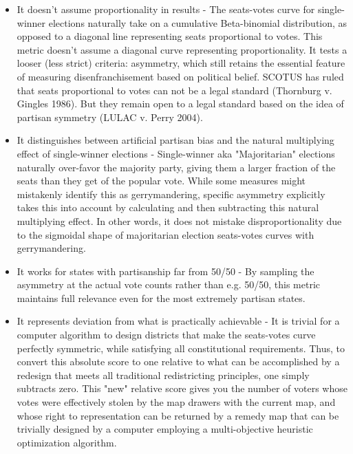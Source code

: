 \documentclass[preprint,12pt]{article}
\begin{document}
\begin{itemize}

\item It doesn't assume proportionality in results - The seats-votes curve for single-winner elections naturally take on a cumulative Beta-binomial distribution, as opposed to a diagonal line representing seats proportional to votes.  This metric doesn't assume a diagonal curve representing proportionality.  It tests a looser (less strict) criteria: asymmetry, which still retains the essential feature of measuring disenfranchisement based on political belief.  SCOTUS has ruled that seats proportional to votes can not be a legal standard (Thornburg v. Gingles 1986).   But they remain open to a legal standard based on the idea of partisan symmetry (LULAC v. Perry 2004).
 
\item It distinguishes between artificial partisan bias and the natural multiplying effect of single-winner elections -  Single-winner aka "Majoritarian" elections naturally over-favor the majority party, giving them a larger fraction of the seats than they get of the popular vote.  
While some measures might mistakenly identify this as gerrymandering, specific asymmetry explicitly takes this into account by calculating and then subtracting this natural multiplying effect.
In other words, it does not mistake disproportionality due to the sigmoidal shape of majoritarian election seats-votes curves with gerrymandering.

\item It works for states with partisanship far from 50/50 - By sampling the asymmetry at the actual vote counts rather than e.g. 50/50, this metric maintains full relevance even for the most extremely partisan states.

\item It represents deviation from what is practically achievable - It is trivial for a computer algorithm to design districts that make the seats-votes curve perfectly symmetric, while satisfying all constitutional requirements.  
Thus, to convert this absolute score to one relative to what can be accomplished by a redesign that meets all traditional redistricting principles, one simply subtracts zero.  
This "new" relative score gives you the number of voters whose votes were effectively stolen by the map drawers with the current map, and whose right to representation can be returned by a remedy map that can be trivially designed by a computer employing a multi-objective heuristic optimization algorithm.


\end{itemize}
\end{document}
